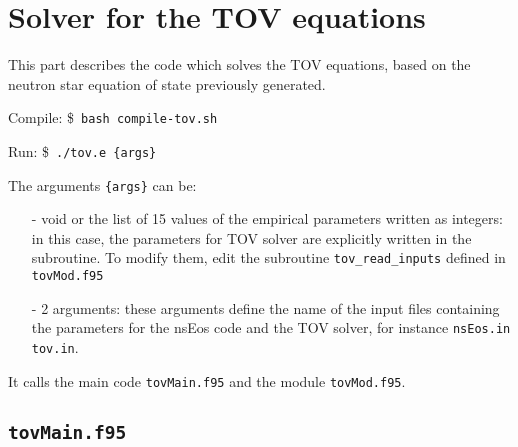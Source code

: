 \documentclass[11pt]{article}
\newcommand{\code}[1]{\colorbox{light-gray}{\mbox{\texttt{#1}}}}
\newcommand{\bash}[1]{\colorbox{light-gray}{\mbox{\$ \texttt{#1}}}}
\begin{document}
\section{Solver for the TOV equations}
\label{sec:tov}

This part describes the code which solves the TOV equations, based on the neutron star equation of state previously generated.

Compile: \bash{bash compile-tov.sh}

Run: \bash{./tov.e \{args\}}

The arguments \code{\{args\}} can be:
\begin{enumerate}
\item[-] void or the list of 15 values of the empirical parameters written as integers: in this case, the parameters for TOV solver are explicitly written in the subroutine. To modify them, edit the subroutine \code{tov\_read\_inputs} defined in \code{tovMod.f95} 
\item[-] 2 arguments: these arguments define the name of the input files containing the parameters for the nsEos code and the TOV solver, for instance \code{nsEos.in tov.in}.
\end{enumerate}

It calls the main code \code{tovMain.f95} and the module  \code{tovMod.f95}.

\subsection{\code{tovMain.f95}}
\end{document}

